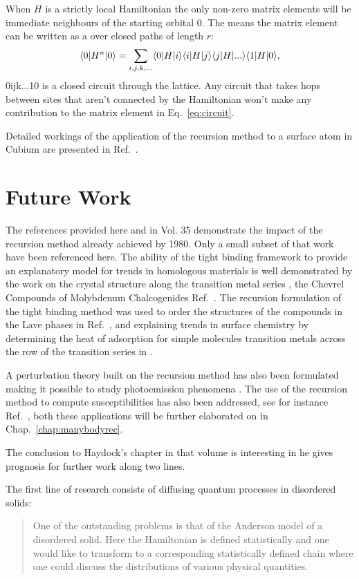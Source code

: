 When $H$ is a strictly local Hamiltonian the only non-zero matrix elements 
will be immediate neighbours of the starting orbital $0$. The means
the matrix element can be written as a over closed paths of length $r$:
%
\begin{equation}
\label{eq:circuit}
\langle 0|H^{n}|0 \rangle = \sum_{i,j,k,...}\langle 0|H|i\rangle\langle i|H|j\rangle\langle j|H|...\rangle\langle 1|H|0\rangle,
\end{equation}
%
0ijk...10 is a closed circuit through the lattice. Any circuit that takes hops between sites 
that aren't connected by the Hamiltonian won't make any contribution to the matrix element
in Eq.~\ref{eq:circuit}.

Detailed workings of the application of the recursion method to a surface atom in Cubium
are presented in Ref.~\cite{haydock75}. 

\section{Future Work}
The references provided here and in Vol. 35 demonstrate the impact of 
the recursion method already achieved by 1980. Only a small subset of that 
work have been referenced here. The ability of the tight binding framework 
to provide an explanatory model for trends in homologous materials is 
well demonstrated by the work on the crystal structure along the transition
metal series \cite{pettifor70}, the Chevrel Compounds of Molybdenum Chalcogenides Ref.~\cite{bullet77}.
The recursion formulation of the tight binding method was used to order
the structures of the compounds in the Lave phases in Ref.~\cite{johannes76},
and explaining trends in surface chemistry by determining 
the heat of adsorption for simple molecules transition metals across 
the row of the transition series in \cite{haydock78}. 

A perturbation theory built on the recursion method has also been formulated
making it possible to study photoemission phenomena \cite{mclean77}. 
The use of the recursion method to compute susceptibilities has also been addressed, 
see for instance Ref.~\cite{terakura78}, both these applications will be further 
elaborated on in Chap.~\ref{chap:manybodyrec}.

The conclusion to Haydock's chapter in that volume is interesting in he gives 
prognosis for further work along two lines. 

The first line of research consists of diffusing quantum processes in disordered
solids:
%
\begin{quote}
One of the outstanding problems is that of the Anderson model
of a disordered solid. Here the Hamiltonian is defined statistically and
one would like to transform to a corresponding statistically defined chain where
one could discuss the distributions of various physical quantities.
\end{quote}
%

